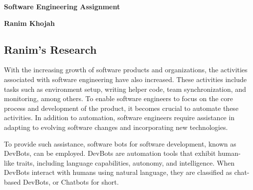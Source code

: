 \documentclass[10pt, a4paper]{article}
\newcommand\Information{Ranim Khojah}                        %
\begin{document}
\begin{titlepage}
    \begin{center}
        \vspace*{3cm}
            
        \Huge
        \textbf{Software Engineering Assignment}
            
        \vspace{1cm}
        \huge
            
        \vspace{1.5cm}
        \Large
            
        \textbf{\Information}                      %
        
            
        \vfill
        
            
        \vspace{1cm}
            
        
        
            
    \end{center}
\end{titlepage}

\newpage


\subsection{Ranim's Research}
\label{sec:ranim}
With the increasing growth of software products and organizations, the activities associated with software engineering have also increased. These activities include tasks such as environment setup, writing helper code, team synchronization, and monitoring, among others. To enable software engineers to focus on the core process and development of the product, it becomes crucial to automate these activities. In addition to automation, software engineers require assistance in adapting to evolving software changes and incorporating new technologies.

To provide such assistance, software bots for software development, known as DevBots, can be employed. DevBots are automation tools that exhibit human-like traits, including language capabilities, autonomy, and intelligence. When DevBots interact with humans using natural language, they are classified as chat-based DevBots, or Chatbots for short.
\end{document}

